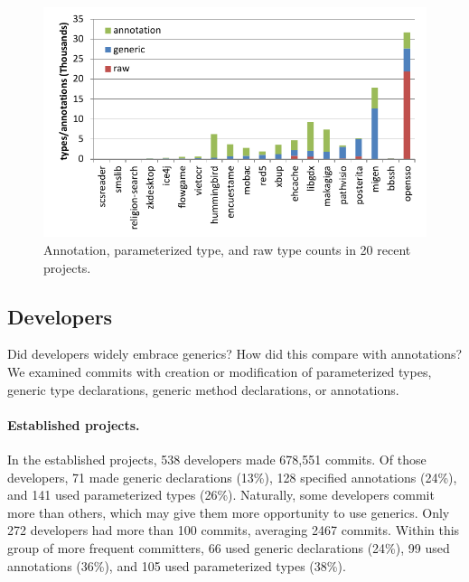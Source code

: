 \documentclass{svjour3}
\newcommand{\todo}[1]{}
\begin{document}
\begin{figure}[htb]
	\centering
	\includegraphics[width=\columnwidth]{newProjectsUsage}
	\caption{Annotation, parameterized type, and raw 
			type counts in 20 recent projects.}
	\label{fig:newProjectsUseOfGenerics}
\end{figure}


\subsection{Developers}

Did developers widely embrace generics? How did this compare with annotations?
We examined commits with creation or modification of parameterized types, 
generic type declarations, generic method declarations, or annotations.

\paragraph{Established projects.}In the established projects, 538 developers made 678,551 commits.
Of those developers, 71 made generic declarations (13\%), 128 specified annotations (24\%), and 141 used parameterized types (26\%).
Naturally, some developers commit more than others, which may give them more opportunity to use generics.  
Only 272 developers had more than 100 commits, averaging 2467 commits.  Within this group of 
more frequent committers, 66 used generic declarations (24\%), 99 used annotations (36\%), and 105 used parameterized types (38\%).
\end{document}
